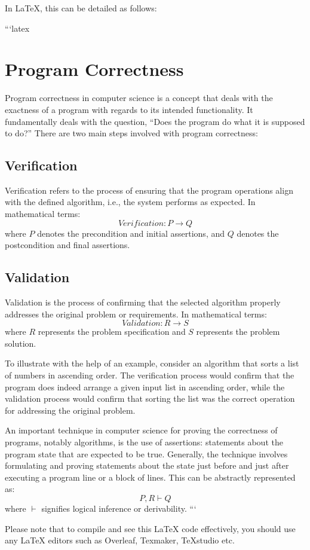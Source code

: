 In LaTeX, this can be detailed as follows:

```latex
\section{Program Correctness}

Program correctness in computer science is a concept that deals with the exactness of a program with regards to its intended functionality. It fundamentally deals with the question, ``Does the program do what it is supposed to do?'' There are two main steps involved with program correctness:

\subsection{Verification}
Verification refers to the process of ensuring that the program operations align with the defined algorithm, i.e., the system performs as expected. In mathematical terms:
\begin{equation}
Verification: P \rightarrow Q
\end{equation}
where $P$ denotes the precondition and initial assertions, and $Q$ denotes the postcondition and final assertions.

\subsection{Validation}
Validation is the process of confirming that the selected algorithm properly addresses the original problem or requirements. In mathematical terms:
\begin{equation}
Validation: R \rightarrow S
\end{equation}
where $R$ represents the problem specification and $S$ represents the problem solution.

To illustrate with the help of an example, consider an algorithm that sorts a list of numbers in ascending order. The verification process would confirm that the program does indeed arrange a given input list in ascending order, while the validation process would confirm that sorting the list was the correct operation for addressing the original problem.

An important technique in computer science for proving the correctness of programs, notably algorithms, is the use of assertions: statements about the program state that are expected to be true. Generally, the technique involves formulating and proving statements about the state just before and just after executing a program line or a block of lines. This can be abstractly represented as:
\begin{equation}
P, R \vdash Q
\end{equation}
where $\vdash$ signifies logical inference or derivability.
```

Please note that to compile and see this LaTeX code effectively, you should use any LaTeX editors such as Overleaf, Texmaker, TeXstudio etc.

